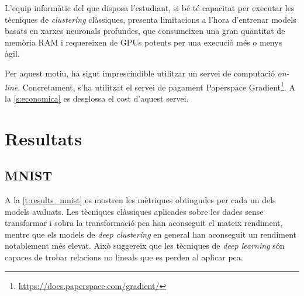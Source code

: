 \documentclass[CAT,BIB]{TFUOC}%
\begin{document}
            L'equip informàtic del que disposa l'estudiant,
            si bé té capacitat per executar les tècniques de \textit{clustering} clàssiques,
            presenta limitacions a l'hora d'entrenar models
            basats en xarxes neuronals profundes,
            que consumeixen una gran quantitat de memòria RAM
            i requereixen de GPUs potents per una execució més o menys àgil.

            Per aquest motiu,
            ha sigut imprescindible utilitzar un servei de computació \textit{on-line}.
            Concretament, s'ha utilitzat el servei de pagament Paperspace Gradient\footnote{\url{https://docs.paperspace.com/gradient/}}.
            A la \cref{s:economica} es desglossa el cost d'aquest servei.



\chapter{Resultats}
\label{c:resultats}

    \section{MNIST}
    \label{s:results_mnist}

        A la \cref{t:results_mnist} es mostren les mètriques
        obtingudes per cada un dels models avaluats.
        Les tècniques clàssiques aplicades sobre les dades sense transformar
        i sobra la transformació \gls{pca}
        han aconseguit el mateix rendiment,
        mentre que els models de \textit{deep clustering}
        en general han aconseguit un rendiment notablement més elevat.
        Això suggereix que les tècniques de \textit{deep learning}
        són capaces de trobar relacions no lineals
        que es perden al aplicar \gls{pca}.
\end{document}
